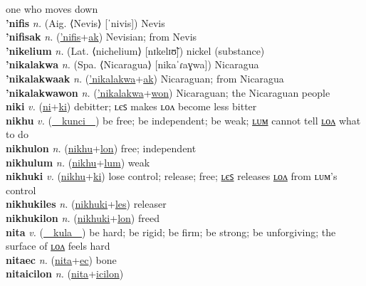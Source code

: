 one who moves down \label{nicekiles} \\
\textbf{'nifis} \textit{n.} (Aig. ⟨Nevis⟩ [ˈnivis])
Nevis \label{'nifis} \\
\textbf{'nifisak} \textit{n.} (\hyperref['nifis]{'nifis}+\hyperref[ak]{ak})
Nevisian; from Nevis \label{'nifisak} \\
\textbf{'nikelium} \textit{n.} (Lat. ⟨nichelium⟩ [nɪkelɪʊ̃])
nickel (substance) \label{'nikelium} \\
\textbf{'nikalakwa} \textit{n.} (Spa. ⟨Nicaragua⟩ [nikaˈɾaɣwa])
Nicaragua \label{'nikalakwa} \\
\textbf{'nikalakwaak} \textit{n.} (\hyperref['nikalakwa]{'nikalakwa}+\hyperref[ak]{ak})
Nicaraguan; from Nicaragua \label{'nikalakwaak} \\
\textbf{'nikalakwawon} \textit{n.} (\hyperref['nikalakwa]{'nikalakwa}+\hyperref[won]{won})
Nicaraguan; the Nicaraguan people \label{'nikalakwawon} \\
\textbf{niki} \textit{v.} (\hyperref[ni]{ni}+\hyperref[ki]{ki})
debitter; ʟєꜱ makes ʟᴏᴧ become less bitter \label{niki} \\
\textbf{nikhu} \textit{v.} (\hyperref[kunci]{~~kunci~~})
be free; be independent; be weak; \hyperref[nikhulum]{ʟᴜᴍ} cannot tell \hyperref[nikhulon]{ʟᴏᴧ} what to do \label{nikhu} \\
\textbf{nikhulon} \textit{n.} (\hyperref[nikhu]{nikhu}+\hyperref[lon]{lon})
free; independent \label{nikhulon} \\
\textbf{nikhulum} \textit{n.} (\hyperref[nikhu]{nikhu}+\hyperref[lum]{lum})
weak \label{nikhulum} \\
\textbf{nikhuki} \textit{v.} (\hyperref[nikhu]{nikhu}+\hyperref[ki]{ki})
lose control; release; free; \hyperref[nikhukiles]{ʟєꜱ} releases \hyperref[nikhukilon]{ʟᴏᴧ} from ʟᴜᴍ’s control \label{nikhuki} \\
\textbf{nikhukiles} \textit{n.} (\hyperref[nikhuki]{nikhuki}+\hyperref[les]{les})
releaser \label{nikhukiles} \\
\textbf{nikhukilon} \textit{n.} (\hyperref[nikhuki]{nikhuki}+\hyperref[lon]{lon})
freed \label{nikhukilon} \\
\textbf{nita} \textit{v.} (\hyperref[kula]{~~kula~~})
be hard; be rigid; be firm; be strong; be unforgiving; the surface of \hyperref[nitalon]{ʟᴏᴧ} feels hard \label{nita} \\
\textbf{nitaec} \textit{n.} (\hyperref[nita]{nita}+\hyperref[ec]{ec})
bone \label{nitaec} \\
\textbf{nitaicilon} \textit{n.} (\hyperref[nita]{nita}+\hyperref[icilon]{icilon})
